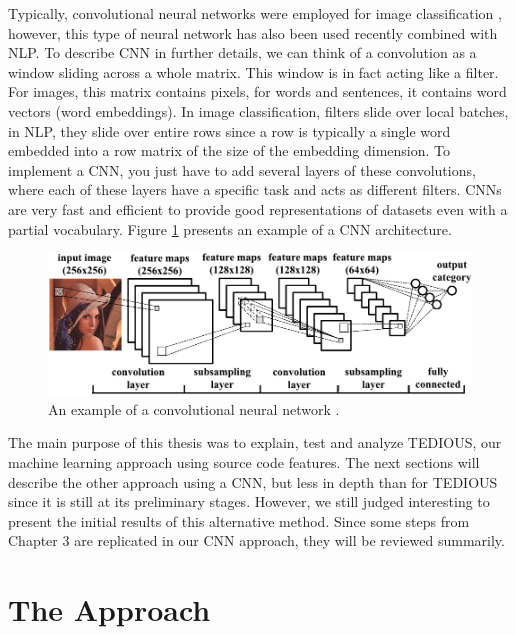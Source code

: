 Typically, convolutional neural networks were employed for image classification \citep{krizhevsky2012imagenet}, however, this type of neural network has also been used recently combined with NLP. To describe CNN in further details, we can think of a convolution as a window sliding across a whole matrix. This window is in fact acting like a filter. For images, this matrix contains pixels, for words and sentences, it contains word vectors (word embeddings). In image classification, filters slide over local batches, in NLP, they slide over entire rows since a row is typically a single word embedded into a row matrix of the size of the embedding dimension. To implement a CNN, you just have to add several layers of these convolutions, where each of these layers have a specific task and acts as different filters. CNNs are very fast and efficient to provide good representations of datasets even with a partial vocabulary. Figure \ref{fig:example} presents an example of a CNN architecture.

\begin{figure}[t]
	\centering
	\includegraphics[width=\linewidth]{figs/CNN-example.png}
	\caption{An example of a convolutional neural network \citep{Cong2014MinimizingCI}.}
	\label{fig:example}
	\vspace{-4mm}
\end{figure}

The main purpose of this thesis was to explain, test and analyze TEDIOUS, our machine learning approach using source code features. The next sections will describe the other approach using a CNN, but less in depth than for TEDIOUS since it is still at its preliminary stages. However, we still judged interesting to present the initial results of this alternative method. Since some steps from Chapter 3 are replicated in our CNN approach, they will be reviewed summarily.

\section{The Approach}

